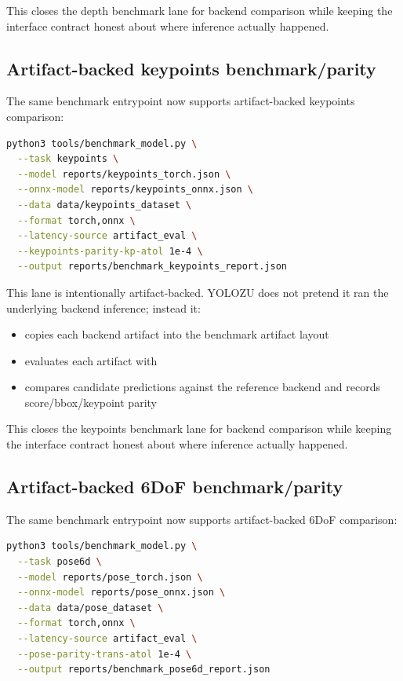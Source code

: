 This closes the depth benchmark lane for backend comparison while keeping the
interface contract honest about where inference actually happened.

\subsection{Artifact-backed keypoints benchmark/parity}
The same benchmark entrypoint now supports artifact-backed keypoints comparison:
\begin{lstlisting}[language=bash]
python3 tools/benchmark_model.py \
  --task keypoints \
  --model reports/keypoints_torch.json \
  --onnx-model reports/keypoints_onnx.json \
  --data data/keypoints_dataset \
  --format torch,onnx \
  --latency-source artifact_eval \
  --keypoints-parity-kp-atol 1e-4 \
  --output reports/benchmark_keypoints_report.json
\end{lstlisting}

This lane is intentionally artifact-backed. YOLOZU does not pretend it
ran the underlying backend inference; instead it:
\begin{itemize}
  \item copies each backend  artifact into the benchmark artifact layout
  \item evaluates each artifact with 
  \item compares candidate predictions against the reference backend and records score/\allowbreak bbox/\allowbreak keypoint parity
\end{itemize}

This closes the keypoints benchmark lane for backend comparison while keeping the
interface contract honest about where inference actually happened.

\subsection{Artifact-backed 6DoF benchmark/parity}
The same benchmark entrypoint now supports artifact-backed 6DoF comparison:
\begin{lstlisting}[language=bash]
python3 tools/benchmark_model.py \
  --task pose6d \
  --model reports/pose_torch.json \
  --onnx-model reports/pose_onnx.json \
  --data data/pose_dataset \
  --format torch,onnx \
  --latency-source artifact_eval \
  --pose-parity-trans-atol 1e-4 \
  --output reports/benchmark_pose6d_report.json
\end{lstlisting}


